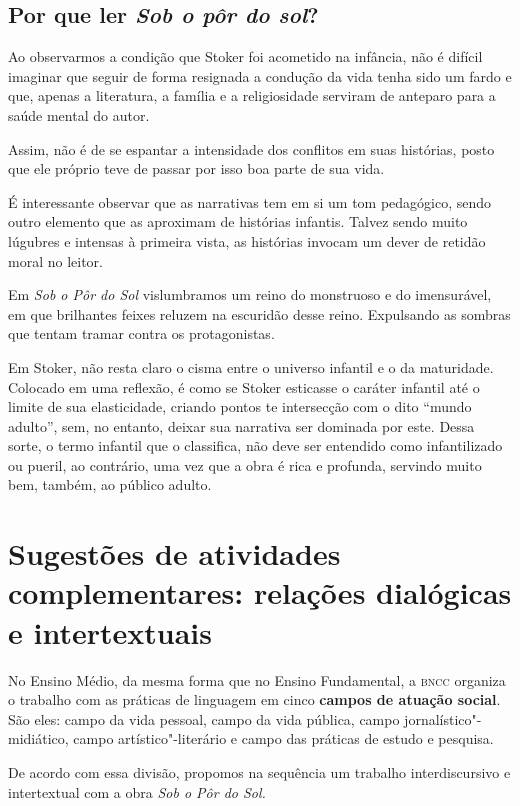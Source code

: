 \documentclass[12pt]{extarticle}
\begin{document}
\subsection{Por que ler \textit{Sob o pôr do sol}?}

Ao observarmos a condição que Stoker foi acometido na infância, não é
difícil imaginar que seguir de forma resignada a condução da vida tenha
sido um fardo e que, apenas a literatura, a família e a religiosidade
serviram de anteparo para a saúde mental do autor.

Assim, não é de se espantar a intensidade dos conflitos em suas
histórias, posto que ele próprio teve de passar por isso boa parte de
sua vida.

É interessante observar que as narrativas tem em si um tom pedagógico,
sendo outro elemento que as aproximam de histórias infantis. Talvez
sendo muito lúgubres e intensas à primeira vista, as histórias invocam
um dever de retidão moral no leitor.

Em \emph{Sob o Pôr do Sol} vislumbramos um reino do monstruoso e do
imensurável, em que brilhantes feixes reluzem na escuridão desse reino.
Expulsando as sombras que tentam tramar contra os protagonistas.

Em Stoker, não resta claro o cisma entre o universo infantil e o da
maturidade. Colocado em uma reflexão, é como se Stoker esticasse o
caráter infantil até o limite de sua elasticidade, criando pontos te
intersecção com o dito ``mundo adulto'', sem, no entanto, deixar sua
narrativa ser dominada por este. Dessa sorte, o termo infantil que o
classifica, não deve ser entendido como infantilizado ou pueril, ao
contrário, uma vez que a obra é rica e profunda, servindo muito bem,
também, ao público adulto.

\section{Sugestões de atividades complementares: relações dialógicas e
intertextuais}


No Ensino Médio, da mesma forma que no Ensino Fundamental, a \textsc{bncc}
organiza o trabalho com as práticas de linguagem em cinco \textbf{campos
de atuação social}. São eles: campo da vida pessoal, campo da vida
pública, campo jornalístico"-midiático, campo artístico"-literário e campo
das práticas de estudo e pesquisa.

De acordo com essa divisão, propomos na sequência um trabalho
interdiscursivo e intertextual com a obra \emph{Sob o Pôr do Sol.}
\end{document}
